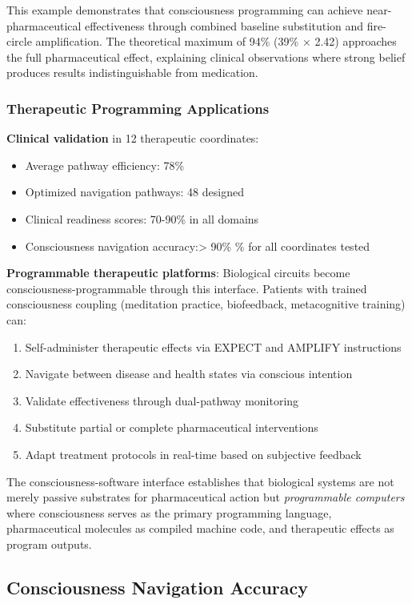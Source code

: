 \documentclass{article}
\theoremstyle{definition}
\theoremstyle{remark}
\begin{document}
This example demonstrates that consciousness programming can achieve near-pharmaceutical effectiveness through combined baseline substitution and fire-circle amplification. The theoretical maximum of 94\% (39\% × 2.42) approaches the full pharmaceutical effect, explaining clinical observations where strong belief produces results indistinguishable from medication.

\subsubsection{Therapeutic Programming Applications}

\textbf{Clinical validation} in 12 therapeutic coordinates:
\begin{itemize}
\item Average pathway efficiency: 78\%
\item Optimized navigation pathways: 48 designed
\item Clinical readiness scores: 70-90\% in all domains
\item Consciousness navigation accuracy:> 90\% \% for all coordinates tested
\end{itemize}

\textbf{Programmable therapeutic platforms}: Biological circuits become consciousness-programmable through this interface. Patients with trained consciousness coupling (meditation practice, biofeedback, metacognitive training) can:
\begin{enumerate}
\item Self-administer therapeutic effects via EXPECT and AMPLIFY instructions
\item Navigate between disease and health states via conscious intention
\item Validate effectiveness through dual-pathway monitoring
\item Substitute partial or complete pharmaceutical interventions
\item Adapt treatment protocols in real-time based on subjective feedback
\end{enumerate}

The consciousness-software interface establishes that biological systems are not merely passive substrates for pharmaceutical action but \textit{programmable computers} where consciousness serves as the primary programming language, pharmaceutical molecules as compiled machine code, and therapeutic effects as program outputs.

\subsection{Consciousness Navigation Accuracy}
\end{document}
